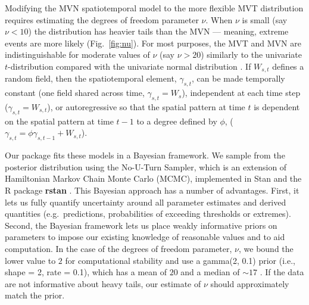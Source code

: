 \documentclass[12pt,english]{article}
\begin{document}
\begin{spacing}{1.9}
Modifying the MVN spatiotemporal model to the more flexible MVT distribution
requires estimating the degrees of freedom parameter $\nu$. When $\nu$ is small
(say $\nu < 10$) the distribution has heavier tails than the MVN --- meaning,
extreme events are more likely (Fig.~\ref{fig:nu}). For most purposes, the MVT
and MVN are indistinguishable for moderate values of $\nu$ (say $\nu > 20$)
similarly to the univariate $t$-distribution compared with the univariate normal
distribution \citep[e.g.][]{anderson2017}.
If $W_{s,t}$ defines a random field, then the spatiotemporal element,
$\gamma_{s,t}$, can be made temporally constant (one field shared across time,
$\gamma_{s,t} = W_{s}$), independent at each time step ($\gamma_{s,t} =
W_{s,t}$), or autoregressive so that the spatial pattern at time $t$ is
dependent on the spatial pattern at time $t-1$ to a degree defined by $\phi$,
($\gamma_{s,t} = \phi \gamma_{s,t-1} + W_{s,t}$).

Our package fits these models in a Bayesian framework. We sample from the
posterior distribution using the No-U-Turn Sampler, which is an extension of
Hamiltonian Markov Chain Monte Carlo (MCMC), implemented in Stan
\citep{standevelopmentteam2016a, carpenter2017} and the R package \textbf{rstan}
\citep{standevelopmentteam2016}. This Bayesian approach has a number of
advantages. First, it lets us fully quantify uncertainty around all parameter
estimates and derived quantities (e.g.\ predictions, probabilities of exceeding
thresholds or extremes). Second, the Bayesian framework lets us place weakly
informative priors on parameters to impose our existing knowledge of reasonable
values and to aid computation. In the case of the degrees of freedom parameter,
$\nu$, we bound the lower value to $2$ for computational stability and use a
gamma(2, 0.1) prior (i.e., shape = 2, rate = 0.1), which has a mean of $20$ and
a median of $\sim 17$ \citep{juarez2010}. If the data are not informative about
heavy tails, our estimate of $\nu$ should approximately match the prior.


\end{spacing}
\end{document}
